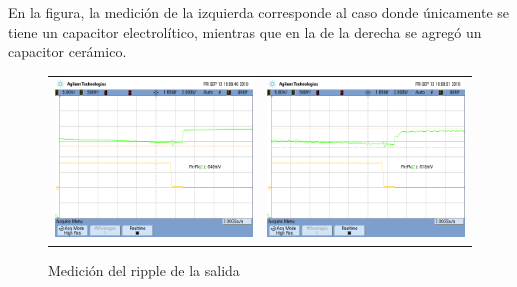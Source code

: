 En la figura, la medici\'on de la izquierda corresponde al caso donde \'unicamente se tiene un capacitor electrol\'itico, mientras que en la de la derecha se agreg\'o un capacitor cer\'amico.

\begin{figure}[H]
    \centering
    \begin{tabular}{c c}
        \includegraphics[scale=0.2]{../Mediciones/Osciloscopio/Ripple_Capacitor_Adicional/scope_15.png} &
        \includegraphics[scale=0.2]{../Mediciones/Osciloscopio/Ripple_Capacitor_Adicional/scope_16.png}  
    \end{tabular}
    \caption{Medici\'on del ripple de la salida}
    \label{fig:salida_ripple}
\end{figure}

